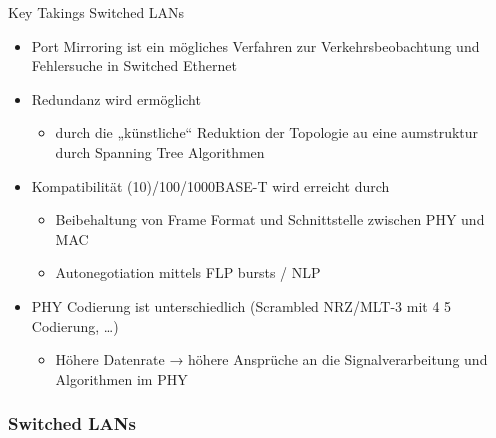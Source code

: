\begin{KR}{Key Takings Switched LANs}
    \begin{itemize}
        \item Port Mirroring ist ein mögliches Verfahren zur Verkehrsbeobachtung und Fehlersuche in Switched Ethernet
        \item Redundanz wird ermöglicht
        \begin{itemize}
            \item durch die „künstliche“ Reduktion der Topologie au eine aumstruktur durch Spanning Tree Algorithmen
        \end{itemize}
        \item Kompatibilität (10)/100/1000BASE-T wird erreicht durch
        \begin{itemize}
            \item Beibehaltung von Frame Format und Schnittstelle zwischen PHY und MAC
            \item Autonegotiation mittels FLP bursts / NLP
        \end{itemize}
        \item PHY Codierung ist unterschiedlich (Scrambled NRZ/MLT-3 mit 4 5 Codierung, …)
        \begin{itemize}
            \item Höhere Datenrate → höhere Ansprüche an die Signalverarbeitung und Algorithmen im PHY
        \end{itemize}
    \end{itemize}
\end{KR}


\subsubsection*{Switched LANs}


